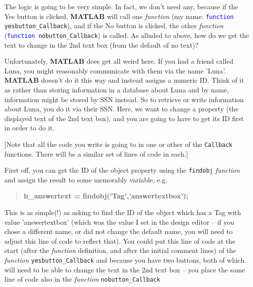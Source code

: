\documentclass{tufte-book} %
\newenvironment{docspecbold}{\begin{quotation}\ttfamily\bfseries\parskip0pt\parindent0pt\ignorespaces}{\end{quotation}}
\begin{document}
The logic is going to be very simple. In fact, we don't need any, because if the Yes button is clicked, \textbf{MATLAB} will call one \textit{function} (my name: \texttt{\textcolor{blue}{function} yesbutton\_Callback}), and if the No button is clicked, the other \textit{function} (\texttt{\textcolor{blue}{function} nobutton\_Callback}) is called. As alluded to above, how do we get the text to change in the 2nd text box (from the default of no text)?

Unfortunately, \textbf{MATLAB} does get all weird here. If you had a friend called Luna, you might reasonably communicate with them via the name 'Luna'. \textbf{MATLAB} doesn't do it this way and instead assigns a numeric ID. Think of it as rather than storing information in a database about Luna and by name, information might be stored by SSN instead. So to retrieve or write information about Luna, you do it via their SSN. Here, we want to change a property (the displayed text  of the 2nd text box), and you are going to have to get its ID first in order to do it.

[Note that all the code you write is going to in one or other of the \texttt{Callback} functions. There will be a similar set of lines of code in each.]

First off, you can get the ID of the object property using the \texttt{findobj} \textit{function} and assign the result to some memorably variable, e.g.
\vspace{-1mm}\begin{docspecbold}
h\_answertext = findobj('Tag','answertextbox');
\end{docspecbold}\vspace{-1mm}
This is as simple(!) as asking to find the ID of the object which has a \textsf{Tag} with value '\textsf{answertextbox}' (which was the value I set in the design editor -- if you chose a different name, or did not change the default name, you will need to adjust this line of code to reflect that). You could put this line of code at the start (after the \textit{function} definition, and after the initial comment lines) of the \textit{function} \texttt{yesbutton\_Callback} and because you have two buttons, both of which will need to be able to change the text in the 2nd text box -- you place the same line of code also in the \textit{function} \linebreak \texttt{nobutton\_Callback}
\end{document}
